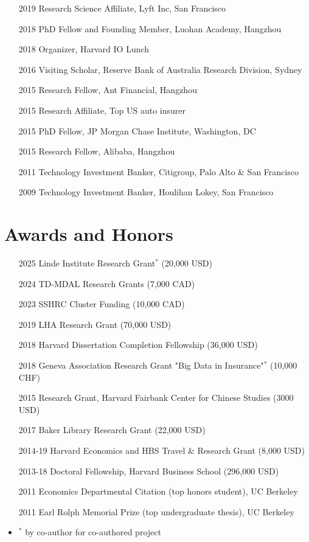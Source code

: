 \begin{itemize}
\item[2019] Research Science Affiliate, Lyft Inc, San Francisco
\item[2018] PhD Fellow and Founding Member, Luohan Academy, Hangzhou
\item[2018] Organizer, Harvard IO Lunch
\item[2016] Visiting Scholar, Reserve Bank of Australia Research Division, Sydney
\item[2015]	Research Fellow, Ant Financial, Hangzhou
\item[2015] Research Affiliate, Top US auto insurer
\item[2015] PhD Fellow, JP Morgan Chase Institute, Washington, DC
\item[2015]	Research Fellow, Alibaba, Hangzhou
\item[2011]	Technology Investment Banker, Citigroup, Palo Alto \& San Francisco
\item[2009]	Technology Investment Banker, Houlihan Lokey, San Francisco
\end{itemize}

\vspace{0.05cm}
\section*{Awards and Honors}
\begin{itemize}
\item[2025] Linde Institute Research Grant$^{*}$ (20,000 USD)
\item[2024] TD-MDAL Research Grants (7,000 CAD)
\item[2023] SSHRC Cluster Funding (10,000 CAD)
\item[2019] LHA Research Grant (70,000 USD)
\item[2018] Harvard Dissertation Completion Fellowship (36,000 USD)
\item[2018] Geneva Association Research Grant "Big Data in Insurance"$^{*}$ (10,000 CHF)
\item[2015] Research Grant, Harvard Fairbank Center for Chinese Studies (3000 USD)
\item[2017] Baker Library Research Grant (22,000 USD)
\item[2014-19] Harvard Economics and HBS Travel \& Research Grant (8,000 USD)
\item[2013-18]	Doctoral Fellowship, Harvard Business School (296,000 USD)
\item[2011]	Economics Departmental Citation (top honors student), UC Berkeley
\item[2011]	Earl Rolph Memorial Prize (top undergraduate thesis), UC Berkeley
\item $^{*}$ by co-author for co-authored project
\end{itemize}

